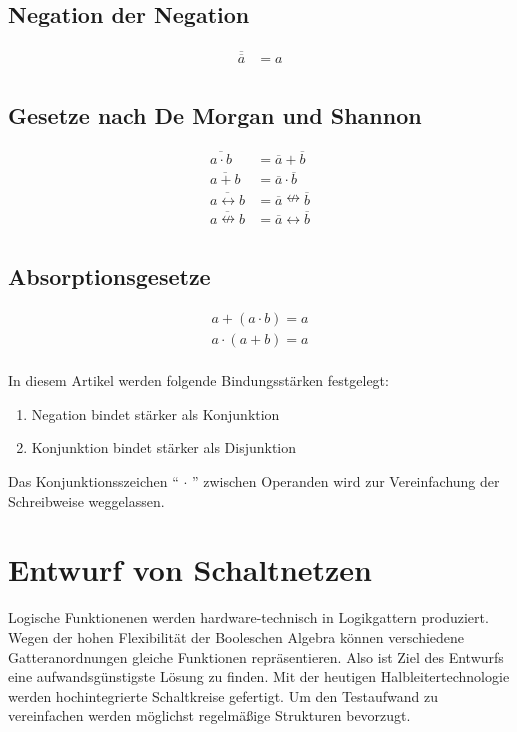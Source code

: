 \subsection*{Negation der Negation}
\begin{align*}
	\overline{\overline{a}} & = a \\
\end{align*}

\subsection*{Gesetze nach De Morgan und Shannon}
\begin{align*}
	\overline{a \cdot b} & = \overline a + \overline b \\
	\overline{a + b} & = \overline a \cdot \overline b \\
	\overline{a \leftrightarrow b} 
		& = \overline a \nleftrightarrow \overline b \\
	\overline{a \nleftrightarrow b} 
		& = \overline a \leftrightarrow \overline b \\
\end{align*}

\subsection*{Absorptionsgesetze}
\begin{align*}
	a + (a \cdot b) = a \\
	a \cdot (a + b) = a \\
\end{align*}

In diesem Artikel werden folgende Bindungsstärken festgelegt:
\begin{enumerate}
\item
	Negation bindet stärker als Konjunktion
\item
	Konjunktion bindet stärker als Disjunktion
\end{enumerate}

Das Konjunktionsszeichen "` $\cdot$ "' zwischen Operanden wird zur Vereinfachung der Schreibweise weggelassen.

\section{Entwurf von Schaltnetzen}
Logische Funktionenen werden hardware-technisch in Logikgattern produziert. Wegen der hohen Flexibilität der Booleschen Algebra können verschiedene Gatteranordnungen gleiche Funktionen repräsentieren. Also ist Ziel des Entwurfs eine aufwandsgünstigste Lösung zu finden. Mit der heutigen Halbleitertechnologie werden hochintegrierte Schaltkreise gefertigt. Um den Testaufwand zu vereinfachen werden möglichst regelmäßige Strukturen bevorzugt.

